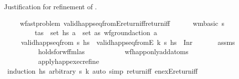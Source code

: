 \begin{isabellebody}
\endisatagproof
{\isafoldproof}%
%
\isadelimproof
%
\endisadelimproof
%
\begin{isamarkuptext}%
Justification for refinement of .%
\end{isamarkuptext}\isamarkuptrue%
\ \ \isamarkupfalse%
\ {\isacharparenleft}{\kern0pt}\ wf{\isacharunderscore}{\kern0pt}ast{\isacharunderscore}{\kern0pt}problem{\isacharparenright}{\kern0pt}\ valid{\isacharunderscore}{\kern0pt}happ{\isacharunderscore}{\kern0pt}seq{\isacharunderscore}{\kern0pt}fromE{\isacharunderscore}{\kern0pt}return{\isacharunderscore}{\kern0pt}iff{\isacharbrackleft}{\kern0pt}return{\isacharunderscore}{\kern0pt}iff{\isacharbrackright}{\kern0pt}{\isacharcolon}{\kern0pt}\ \isanewline
\ \ \ \ \ {\isachardoublequoteopen}wm{\isacharunderscore}{\kern0pt}basic\ s{\isachardoublequoteclose}\ \isanewline
\ \ \ \ \ \ \ \ \ {\isachardoublequoteopen}{\isasymforall}{\isacharparenleft}{\kern0pt}t{\isacharcomma}{\kern0pt}as{\isacharparenright}{\kern0pt}\ {\isasymin}\ set\ hs{\isachardot}{\kern0pt}\ {\isasymforall}a\ {\isasymin}\ set\ as{\isachardot}{\kern0pt}\ wf{\isacharunderscore}{\kern0pt}ground{\isacharunderscore}{\kern0pt}action\ a{\isachardoublequoteclose}\isanewline
\ \ \ \ \ {\isachardoublequoteopen}valid{\isacharunderscore}{\kern0pt}happ{\isacharunderscore}{\kern0pt}seq{\isacharunderscore}{\kern0pt}from\ s\ hs\ {\isasymlongleftrightarrow}\ valid{\isacharunderscore}{\kern0pt}happ{\isacharunderscore}{\kern0pt}seq{\isacharunderscore}{\kern0pt}fromE\ k\ s\ hs\ {\isacharequal}{\kern0pt}\ Inr\ {\isacharparenleft}{\kern0pt}{\isacharparenright}{\kern0pt}{\isachardoublequoteclose}\isanewline
%
\isadelimproof
\ \ \ \ %
\endisadelimproof
%
\isatagproof
{}\isamarkupfalse%
\ assms\ \isanewline
\ \ \ \ \ \ \ \ \ \ holds{\isacharunderscore}{\kern0pt}for{\isacharunderscore}{\kern0pt}wf{\isacharunderscore}{\kern0pt}fmlas\ \isanewline
\ \ \ \ \ \ \ \ \ \ wf{\isacharunderscore}{\kern0pt}happ{\isacharunderscore}{\kern0pt}only{\isacharunderscore}{\kern0pt}add{\isacharunderscore}{\kern0pt}atoms\ \isanewline
\ \ \ \ \ \ \ \ \ \ apply{\isacharunderscore}{\kern0pt}happ{\isacharunderscore}{\kern0pt}exec{\isacharunderscore}{\kern0pt}refine\ \ \isanewline
\ \ \ \ \isamarkupfalse%
\ {\isacharparenleft}{\kern0pt}induction\ hs\ arbitrary{\isacharcolon}{\kern0pt}\ s\ k{\isacharparenright}{\kern0pt}\ {\isacharparenleft}{\kern0pt}auto\ simp{\isacharcolon}{\kern0pt}\ return{\isacharunderscore}{\kern0pt}iff\ en{\isacharunderscore}{\kern0pt}exE{\isacharunderscore}{\kern0pt}return{\isacharunderscore}{\kern0pt}iff{\isacharparenright}{\kern0pt}%

\end{isabellebody}
